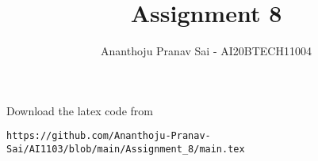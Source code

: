 \documentclass[journal,12pt,twocolumn]{IEEEtran}
\DeclareMathOperator*{\Res}{Res}
\begin{document}
\newcommand{\BEQA}{\begin{eqnarray}}
\newcommand{\EEQA}{\end{eqnarray}}
\newcommand{\define}{\stackrel{\triangle}{=}}

\raggedbottom
\setlength{\parindent}{0pt}
\providecommand{\mbf}{\mathbf}
\providecommand{\pr}[1]{\ensuremath{\Pr\left(#1\right)}}
\providecommand{\qfunc}[1]{\ensuremath{Q\left(#1\right)}}
\providecommand{\sbrak}[1]{\ensuremath{{}\left[#1\right]}}
\providecommand{\lsbrak}[1]{\ensuremath{{}\left[#1\right.}}
\providecommand{\rsbrak}[1]{\ensuremath{{}\left.#1\right]}}
\providecommand{\brak}[1]{\ensuremath{\left(#1\right)}}
\providecommand{\lbrak}[1]{\ensuremath{\left(#1\right.}}
\providecommand{\rbrak}[1]{\ensuremath{\left.#1\right)}}
\providecommand{\cbrak}[1]{\ensuremath{\left\{#1\right\}}}
\providecommand{\lcbrak}[1]{\ensuremath{\left\{#1\right.}}
\providecommand{\rcbrak}[1]{\ensuremath{\left.#1\right\}}}
\theoremstyle{remark}
\newtheorem{rem}{Remark}
\newcommand{\sgn}{\mathop{\mathrm{sgn}}}
\providecommand{\abs}[1]{\vert#1\vert}
\providecommand{\res}[1]{\Res\displaylimits_{#1}} 
\providecommand{\norm}[1]{\lVert#1\rVert}
\providecommand{\mtx}[1]{\mathbf{#1}}
\providecommand{\mean}[1]{E[ #1 ]}
\providecommand{\fourier}{\overset{\mathcal{F}}{ \rightleftharpoons}}
\providecommand{\system}{\overset{\mathcal{H}}{ \longleftrightarrow}}
\newcommand{\solution}{\noindent \textbf{Solution: }}
\newcommand{\cosec}{\,\text{cosec}\,}
\providecommand{\dec}[2]{\ensuremath{\overset{#1}{\underset{#2}{\gtrless}}}}
\newcommand{\myvec}[1]{\ensuremath{\begin{pmatrix}#1\end{pmatrix}}}
\newcommand{\mydet}[1]{\ensuremath{\begin{vmatrix}#1\end{vmatrix}}}
\makeatletter
{}
\makeatother
\let\StandardTheFigure\thefigure
\let\vec\mathbf
\renewcommand{\thefigure}{\theproblem}
\def\putbox#1#2#3{\makebox[0in][l]{\makebox[#1][l]{}\raisebox{\baselineskip}[0in][0in]{\raisebox{#2}[0in][0in]{#3}}}}
     \def\rightbox#1{\makebox[0in][r]{#1}}
     \def\centbox#1{\makebox[0in]{#1}}
     \def\topbox#1{\raisebox{-\baselineskip}[0in][0in]{#1}}
     \def\midbox#1{\raisebox{-0.5\baselineskip}[0in][0in]{#1}}
\vspace{3cm}
\title{Assignment 8}
\author{Ananthoju Pranav Sai - AI20BTECH11004}
\maketitle
\newpage
\bigskip
\renewcommand{\thefigure}{\theenumi}
\renewcommand{\thetable}{\theenumi}
Download the latex code from 
%
\begin{lstlisting}
https://github.com/Ananthoju-Pranav-Sai/AI1103/blob/main/Assignment_8/main.tex
\end{lstlisting}
\end{document}
